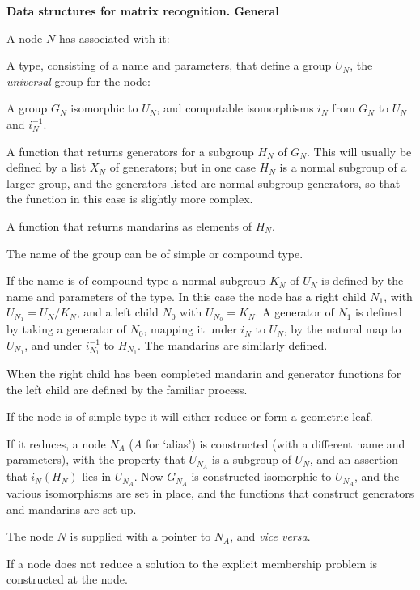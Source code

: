 \centerline{\bf Data structures for matrix recognition.  General}
\medskip
A node $N$ has associated with it:

A type, consisting of a name and parameters, that define a group $U_N$, the {\it universal}
group for the node:

A group $G_N$  isomorphic to $U_N$, and computable isomorphisms $i_N$ from
$G_N$ to $U_N$ and $i_N^{-1}$.

A function that returns generators for a subgroup $H_N$ of $G_N$.  This will usually be defined
by a list $X_N$ of generators; but in one case $H_N$ is a normal subgroup of a larger group, and the 
generators listed are normal subgroup generators, so that the function in this case is slightly more
complex.

A function that returns mandarins as elements of $H_N$.

The name of the group can be of simple or compound type.

If the name is of compound type a normal subgroup $K_N$ of $U_N$ is defined by the name and
parameters of the type.  In this case the node has a right child $N_1$, with $U_{N_1}=U_N/K_N$,
and a left child $N_0$ with $U_{N_0}=K_N$.  A generator of $N_1$ is defined by taking a
generator of $N_0$, mapping it under $i_N$ to $U_N$, by the natural map to $U_{N_1}$, and
under $i_{N_1}^{-1}$ to $H_{N_1}$.  The mandarins are similarly defined.

When the right child has been completed mandarin and generator functions for the left child are
defined by the familiar process.

If the node is of simple type it will either reduce or form a geometric leaf.

If it reduces, a node $N_A$ ($A$ for `alias') is constructed (with a different name 
and parameters), with the property that $U_{N_A}$ is a subgroup of $U_N$, and an assertion
that $i_N(H_N)$ lies in $U_{N_A}$.  Now $G_{N_A}$ is constructed isomorphic to $U_{N_A}$,
and the various isomorphisms are set in place, and the functions that construct generators and
mandarins are set up.

The node $N$ is supplied with a pointer to $N_A$, and {\it vice versa}.

If a node does not reduce a solution to the explicit membership problem is constructed at the node.

\bye

